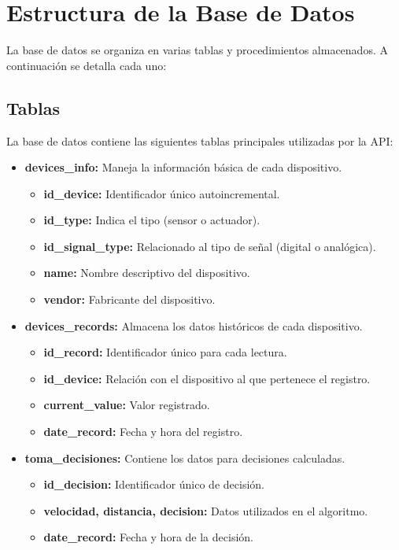 \documentclass[12pt]{article}
\begin{document}
\section{Estructura de la Base de Datos}
La base de datos se organiza en varias tablas y procedimientos almacenados. A continuación se detalla cada uno:

\subsection{Tablas}
La base de datos contiene las siguientes tablas principales utilizadas por la API:

\begin{itemize}
    \item \textbf{devices\_info:} Maneja la información básica de cada dispositivo.
    \begin{itemize}
        \item \textbf{id\_device:} Identificador único autoincremental.
        \item \textbf{id\_type:} Indica el tipo (sensor o actuador).
        \item \textbf{id\_signal\_type:} Relacionado al tipo de señal (digital o analógica).
        \item \textbf{name:} Nombre descriptivo del dispositivo.
        \item \textbf{vendor:} Fabricante del dispositivo.
    \end{itemize}
    
    \item \textbf{devices\_records:} Almacena los datos históricos de cada dispositivo.
    \begin{itemize}
        \item \textbf{id\_record:} Identificador único para cada lectura.
        \item \textbf{id\_device:} Relación con el dispositivo al que pertenece el registro.
        \item \textbf{current\_value:} Valor registrado.
        \item \textbf{date\_record:} Fecha y hora del registro.
    \end{itemize}
    
    \item \textbf{toma\_decisiones:} Contiene los datos para decisiones calculadas.
    \begin{itemize}
        \item \textbf{id\_decision:} Identificador único de decisión.
        \item \textbf{velocidad, distancia, decision:} Datos utilizados en el algoritmo.
        \item \textbf{date\_record:} Fecha y hora de la decisión.
    \end{itemize}
\end{itemize}
\end{document}
